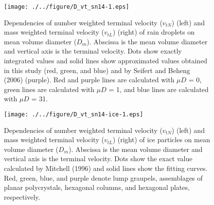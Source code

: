 \begin{figure}[htbp]
\begin{center}
\texttt{[image: ./../figure/D\_vt\_sn14-1.eps]}
\end{center}
\caption{Dependencies of number weighted terminal velocity ($v_{tN}$) (left) and mass weighted terminal velocity ($v_{tL}$) (right) of rain droplets on mean volume diameter ($D_{m}$). Abscissa is the mean volume diameter and vertical axis is the terminal velocity. Dots show exactly integrated values and solid lines show approximated values obtained in this study (red, green, and blue) and by Seifert and Beheng (2006) (purple). Red and purple lines are calculated with $\mu D$ = 0, green lines are calculated with $\mu D$ = 1, and blue lines are calculated with $\mu D$ = 31.}
\label{figsn2-13}
\end{figure}

\begin{figure}[htbp]
\begin{center}
\texttt{[image: ./../figure/D\_vt\_sn14-ice-1.eps]}
\end{center}
\caption{Dependencies of number weighted terminal velocity ($v_{tN}$) (left) and mass weighted terminal velocity ($v_{tL}$) (right) of ice particles on mean volume diameter ($D_{m}$). Abscissa is the mean volume diameter and vertical axis is the terminal velocity. Dots show the exact value calculated by Mitchell (1996) and solid lines show the fitting curves. Red, green, blue, and purple denote lump graupels, assemblages of planar polycrystals, hexagonal columns, and hexagonal plates, respectively.}
\label{figsn2-14}
\end{figure}



